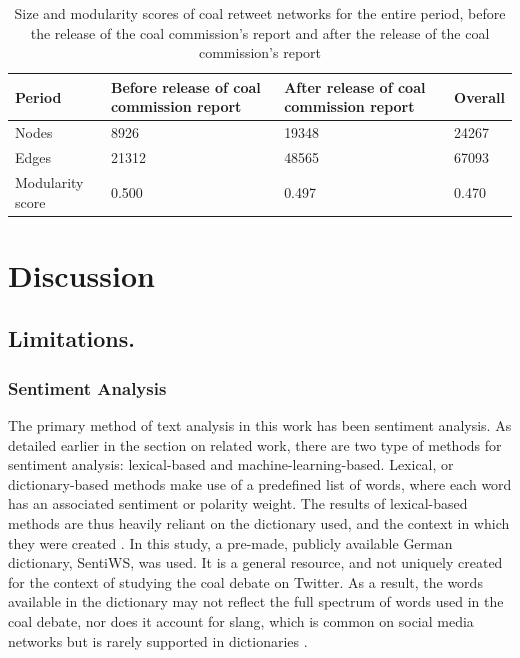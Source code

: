 \documentclass[12pt,onecolumn,twoside]{layout}
\begin{document}
\begin{table}[htbp]
\begin{center}
	\caption{Size and modularity scores of coal retweet networks for the entire period, before the release of the coal commission's report and after the release of the coal commission's report}
	\label{table:rt_network_mod}
	\begin{tabular}{| l | p{2.5cm} | p{2.5cm} | l |}
		\hline
		Period & Before release of coal commission report & After release of coal commission report & Overall \\ \hline
		Nodes & 8926 & 19348 & 24267 \\ \hline
		Edges & 21312 & 48565 & 67093 \\ \hline
		Modularity score & 0.500 & 0.497 & 0.470 \\ \hline
	\end{tabular}
\end{center}
\end{table}


\section{Discussion} \label{sec:discussion}
\subsection*{Limitations.}
\subsubsection*{Sentiment Analysis}
The primary method of text analysis in this work has been sentiment analysis. As detailed earlier in the section on related work, there are two type of methods for sentiment analysis: lexical-based and machine-learning-based. Lexical, or dictionary-based methods make use of a predefined list of words, where each word has an associated sentiment or polarity weight. The results of lexical-based methods are thus heavily reliant on the dictionary used, and the context in which they were created \citep{Goncalves2013}. In this study, a pre-made, publicly available German dictionary, SentiWS, was used. It is a general resource, and not uniquely created for the context of studying the coal debate on Twitter. As a result, the words available in the dictionary may not reflect the full spectrum of words used in the coal debate, nor does it account for slang, which is common on social media networks but is rarely supported in dictionaries \citep{Hu2013}.
\end{document}
